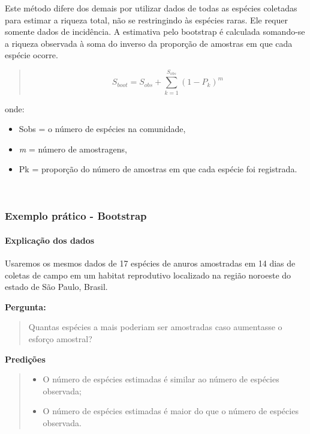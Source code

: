 \documentclass[
]{book}
\providecommand{\tightlist}{%
  \setlength{\itemsep}{0pt}\setlength{\parskip}{0pt}}
\begin{document}
Este método difere dos demais por utilizar dados de todas as espécies coletadas para estimar a riqueza total, não se restringindo às espécies raras. Ele requer somente dados de incidência. A estimativa pelo bootstrap é calculada somando-se a riqueza observada à soma do inverso da proporção de amostras em que cada espécie ocorre.

\begin{quote}
\[S_{boot} = S_{obs} + \sum_{k=1}^{S_{obs}}(1-P_k)^m\]
\end{quote}

onde:

\begin{itemize}
\item
  Sobs = o número de espécies na comunidade,
\item
  \emph{m} = número de amostragens,
\item
  Pk = proporção do número de amostras em que cada espécie foi registrada.
\end{itemize}

~

\hypertarget{exemplo-pruxe1tico---bootstrap}{%
\subsubsection{Exemplo prático - Bootstrap}\label{exemplo-pruxe1tico---bootstrap}}

\hypertarget{explicauxe7uxe3o-dos-dados-5}{%
\paragraph{Explicação dos dados}\label{explicauxe7uxe3o-dos-dados-5}}

Usaremos os mesmos dados de 17 espécies de anuros amostradas em 14 dias de coletas de campo em um habitat reprodutivo localizado na região noroeste do estado de São Paulo, Brasil.

\textbf{Pergunta:}

\begin{quote}
Quantas espécies a mais poderiam ser amostradas caso aumentasse o esforço amostral?
\end{quote}

\textbf{Predições}

\begin{quote}
\begin{itemize}
\tightlist
\item
  O número de espécies estimadas é similar ao número de espécies observada;
\item
  O número de espécies estimadas é maior do que o número de espécies observada.
\end{itemize}
\end{quote}
\end{document}
